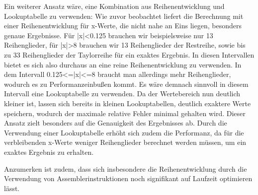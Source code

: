 \documentclass[course=erap] {aspdoc}
\begin{document}
      Ein weiterer Ansatz wäre, eine Kombination aus Reihenentwicklung und Lookuptabelle zu verwenden: 
     Wie zuvor beobachtet liefert die Berechnung mit einer Reihenentwicklung für x-Werte, die nicht nahe an Eins liegen, besonders genaue Ergebnisse. Für |x|<0.125 brauchen wir beispielsweise nur 13 Reihenglieder, für |x|>8 brauchen wir 13 Reihenglieder der Restreihe, sowie bis zu 33 Reihenglieder der Taylorreihe für ein exaktes Ergebnis. In diesen Intervallen bietet es sich also durchaus an eine reine Reihenentwicklung zu verwenden. In dem Intervall 0.125<=|x|<=8 braucht man allerdings mehr Reihenglieder, wodurch es zu Performanzeinbußen kommt. Es wäre demnach sinnvoll in diesem Intervall eine Lookuptabelle zu verwenden. Da der Wertebereich nun deutlich kleiner ist, lassen sich bereits in kleinen Lookuptabellen, deutlich exaktere Werte speichern, wodurch der maximale relative Fehler minimal gehalten wird. Dieser Ansatz zielt besonders auf die Genauigkeit des Ergebnisses ab. Durch die Verwendung einer Lookuptabelle erhöht sich zudem die Performanz, da für die verbleibenden x-Werte weniger Reihenglieder berechnet werden müssen, um ein exaktes Ergebnis zu erhalten. 
 
     Anzumerken ist zudem, dass sich insbesondere die Reihenentwicklung durch die Verwendung von Assemblerinstruktionen noch signifikant auf Laufzeit optimieren lässt. 
 
     
     
 
 
\end{document}
